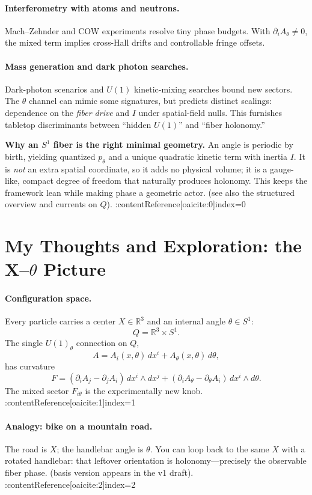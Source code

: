 \paragraph{Interferometry with atoms and neutrons.}
Mach--Zehnder and COW experiments resolve tiny phase budgets. With $\partial_iA_\theta\neq0$, the mixed term implies
cross-Hall drifts and controllable fringe offsets.

\paragraph{Mass generation and dark photon searches.}
Dark-photon scenarios and $U(1)$ kinetic-mixing searches bound new sectors. The $\theta$ channel can mimic some
signatures, but predicts distinct scalings: dependence on the \emph{fiber drive} and $I$ under spatial-field nulls.
This furnishes tabletop discriminants between ``hidden $U(1)$'' and ``fiber holonomy.''

\medskip
\noindent
\textbf{Why an $S^1$ fiber is the right minimal geometry.}
An angle is periodic by birth, yielding quantized $p_\theta$ and a unique quadratic kinetic term with inertia $I$.
It is \emph{not} an extra spatial coordinate, so it adds no physical volume; it is a gauge-like, compact degree of freedom
that naturally produces holonomy. This keeps the framework lean while making phase a geometric actor.%
\hfill{\small(see also the structured overview and currents on $Q$).} :contentReference[oaicite:0]{index=0}

\section{My Thoughts and Exploration: the X--$\theta$ Picture}
\label{sec:my-thoughts}
\paragraph{Configuration space.}
Every particle carries a center $X\in\mathbb{R}^3$ and an internal angle $\theta\in S^1$:
\[
Q=\mathbb{R}^3\times S^1.
\]
The single $U(1)_\theta$ connection on $Q$,
\[
A=A_i(x,\theta)\,dx^i + A_\theta(x,\theta)\,d\theta,
\]
has curvature
\[
F = (\partial_iA_j-\partial_jA_i)\,dx^i\wedge dx^j + (\partial_iA_\theta-\partial_\theta A_i)\,dx^i\wedge d\theta.
\]
The mixed sector $F_{i\theta}$ is the experimentally new knob. :contentReference[oaicite:1]{index=1}

\paragraph{Analogy: bike on a mountain road.}
The road is $X$; the handlebar angle is $\theta$. You can loop back to the same $X$ with a rotated handlebar:
that leftover orientation is holonomy—precisely the observable fiber phase.%
\hfill{\small(basis version appears in the v1 draft).} :contentReference[oaicite:2]{index=2}


